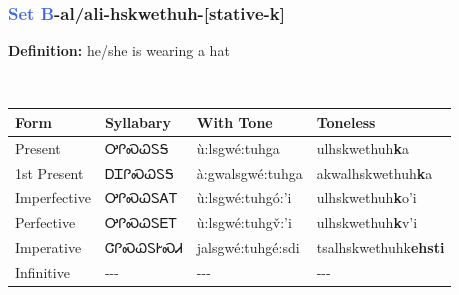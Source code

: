 \subsubsection*{\textcolor{RoyalBlue}{Set B}{-}al/ali{-}\textbf{hskwethuh}{-}[stative-k]}
\nopagebreak
\textbf{Definition: } he/she is wearing a hat
\\[0.5em]
\begin{tabularx}{\textwidth}{l X X X}%
\toprule%
\textbf{Form}&\textbf{Syllabary}&\textbf{With Tone}&\textbf{Toneless}\\%
\midrule%
Present&ᎤᎵᏍᏇᏚᎦ&ù:lsgwé:tuhga&ulhskwethuh\textbf{k}a\\%
1st Present&ᎠᏆᎵᏍᏇᏚᎦ&à:gwalsgwé:tuhga&akwalhskwethuh\textbf{k}a\\%
Imperfective&ᎤᎵᏍᏇᏚᎪᎢ&ù:lsgwé:tuhgó:’i&ulhskwethuh\textbf{k}o'i\\%
Perfective&ᎤᎵᏍᏇᏚᎬᎢ&ù:lsgwé:tuhgv̌:’i&ulhskwethuh\textbf{k}v'i\\%
Imperative&ᏣᎵᏍᏇᏚᎨᏍᏗ&jalsgwé:tuhgé:sdi&tsalhskwethuhk\textbf{ehsti}\\%
Infinitive&{-}{-}{-}&{-}{-}{-}&{-}{-}{-}\\%
\bottomrule%
\end{tabularx}
\\[1em]